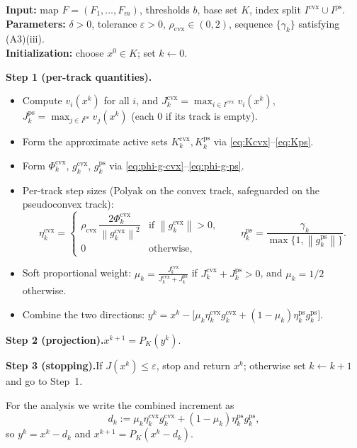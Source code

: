 \documentclass[]{interact}
\theoremstyle{plain}
\theoremstyle{definition}
\theoremstyle{remark}
\newcommand{\algstep}[1]{\smallskip\noindent\textbf{#1}}
\newcommand{\norm}[1]{\left\lVert #1 \right\rVert}
\newcommand{\cvx}{\mathrm{cvx}}
\newcommand{\ps}{\mathrm{ps}}
\begin{document}
\begin{algorithm}[H]
\caption{Dual-Track Adaptive Projection (\textsc{dtap}) for the normal-box NSFP
\eqref{eq:nsfp-box}.}
\label{alg:dtap}
\small
\noindent\textbf{Input:} map $F=(F_1,\dots,F_m)$, thresholds $b$, base set $K$, index
split $I^{\cvx}\cup I^{\ps}$.\\
\textbf{Parameters:} $\delta>0$, tolerance $\varepsilon>0$, $\rho_{\cvx}\in(0,2)$,
sequence $\{\gamma_k\}$ satisfying (A3)(iii).\\
\textbf{Initialization:} choose $x^0\in K$; set $k\leftarrow 0$.

\algstep{Step 1 (per-track quantities).}
\begin{itemize}[leftmargin=1.6em,itemsep=1pt,topsep=2pt]
\item[(1a)] Compute $v_i(x^k)$ for all $i$, and $J^{\cvx}_k=\max_{i\in I^{\cvx}}v_i(x^k)$,
$J^{\ps}_k=\max_{j\in I^{\ps}}v_j(x^k)$ (each $0$ if its track is empty).
\item[(1b)] Form the approximate active sets $K^{\cvx}_k,K^{\ps}_k$ via
\eqref{eq:Kcvx}--\eqref{eq:Kps}.
\item[(1c)] Form $\Phi^{\cvx}_k$, $g^{\cvx}_k$, $g^{\ps}_k$ via
\eqref{eq:phi-g-cvx}--\eqref{eq:phi-g-ps}.
\item[(1d)] Per-track step sizes (Polyak on the convex track, safeguarded on the
pseudoconvex track):
\[
\eta^{\cvx}_k=\begin{cases}\rho_{\cvx}\,\dfrac{2\Phi^{\cvx}_k}{\norm{g^{\cvx}_k}^2} & \text{if }\norm{g^{\cvx}_k}>0,\\ 0 & \text{otherwise,}\end{cases}
\qquad
\eta^{\ps}_k=\frac{\gamma_k}{\max\{1,\norm{g^{\ps}_k}\}} .
\]
\item[(1e)] Soft proportional weight:
$\displaystyle \mu_k=\frac{J^{\cvx}_k}{J^{\cvx}_k+J^{\ps}_k}$ if
$J^{\cvx}_k+J^{\ps}_k>0$, and $\mu_k=1/2$ otherwise.
\item[(1f)] Combine the two directions:
$\displaystyle y^k=x^k-\bigl[\mu_k\eta^{\cvx}_k g^{\cvx}_k+(1-\mu_k)\eta^{\ps}_k g^{\ps}_k\bigr].$
\end{itemize}
\algstep{Step 2 (projection).}\quad $x^{k+1}=P_K(y^k)$.

\algstep{Step 3 (stopping).}\quad If $J(x^k)\le\varepsilon$, stop and return $x^k$;
otherwise set $k\leftarrow k+1$ and go to Step~1.
\end{algorithm}

For the analysis we write the combined increment as
\begin{equation}\label{eq:dk}
d_k:=\mu_k\eta^{\cvx}_k g^{\cvx}_k+(1-\mu_k)\eta^{\ps}_k g^{\ps}_k,
\end{equation}
so $y^k=x^k-d_k$ and $x^{k+1}=P_K(x^k-d_k)$.
\end{document}
